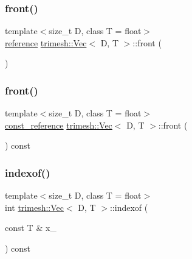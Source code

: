 \mbox{\label{classtrimesh_1_1Vec_a0b8f0b5bb627a093ae7d6b04965328dc}} 
\subsubsection{\texorpdfstring{front()}{front()}\hspace{0.1cm}{\footnotesize\ttfamily [1/2]}}
{\footnotesize\ttfamily template$<$size\+\_\+t D, class T = float$>$ \\
\hyperlink{classtrimesh_1_1Vec_ad76bb92c986524d251998d6eae7d2825}{reference} \hyperlink{classtrimesh_1_1Vec}{trimesh\+::\+Vec}$<$ D, T $>$\+::front (\begin{DoxyParamCaption}{ }\end{DoxyParamCaption})\hspace{0.3cm}{\ttfamily [inline]}}

\mbox{\label{classtrimesh_1_1Vec_ad93fd98078dd442501b463710ccc0aa6}} 
\subsubsection{\texorpdfstring{front()}{front()}\hspace{0.1cm}{\footnotesize\ttfamily [2/2]}}
{\footnotesize\ttfamily template$<$size\+\_\+t D, class T = float$>$ \\
\hyperlink{classtrimesh_1_1Vec_a5ae45a41f93e04534f46b74dee5c6701}{const\+\_\+reference} \hyperlink{classtrimesh_1_1Vec}{trimesh\+::\+Vec}$<$ D, T $>$\+::front (\begin{DoxyParamCaption}{ }\end{DoxyParamCaption}) const\hspace{0.3cm}{\ttfamily [inline]}}

\mbox{\label{classtrimesh_1_1Vec_ad6a5f3d968446baa22ce76d451fb5a6a}} 
\subsubsection{\texorpdfstring{indexof()}{indexof()}}
{\footnotesize\ttfamily template$<$size\+\_\+t D, class T = float$>$ \\
int \hyperlink{classtrimesh_1_1Vec}{trimesh\+::\+Vec}$<$ D, T $>$\+::indexof (\begin{DoxyParamCaption}\item[{const T \&}]{x\+\_\+ }\end{DoxyParamCaption}) const\hspace{0.3cm}{\ttfamily [inline]}}



